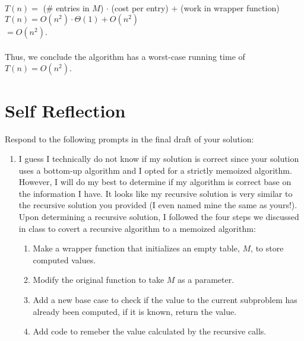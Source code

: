 \documentclass[11pt]{article}
\theoremstyle{nonumberplain}
\begin{document}
\begin{enumerate}
  \\
  $T(n)=$ (\# entries in $M$) $\cdot$ (cost per entry) $+$ (work in wrapper function)\\
  $T(n)=O(n^2) \cdot \Theta(1)+O(n^2)$\\
  \phantom{T(n) }$=O(n^2)$.\\
  \\
  Thus, we conclude the algorithm has a worst-case running time of $T(n)=O(n^2)$. 
\end{enumerate}  
\section*{Self Reflection}
Respond to the following prompts in the final draft of your solution:
\begin{enumerate}
\item I guess I technically do not know if my solution is correct since your solution uses a bottom-up algorithm and I opted for a strictly memoized algorithm. However, I will do my best to determine if my algorithm is correct base on the information I have. It looks like my recursive solution is very similar to the recursive solution you provided (I even named mine the same as yours!). Upon determining a recursive solution, I followed the four steps we discussed in class to covert a recursive algorithm to a memoized algorithm:
\begin{enumerate}
\item Make a wrapper function that initializes an empty table, $M$, to store computed values.
\item Modify the original function to take $M$ as a parameter.
\item Add a new base case to check if the value to the current subproblem has already been computed, if it is known, return the value.
\item Add code to remeber the value calculated by the recursive calls.
\end{enumerate}

\end{enumerate}
\end{document}
